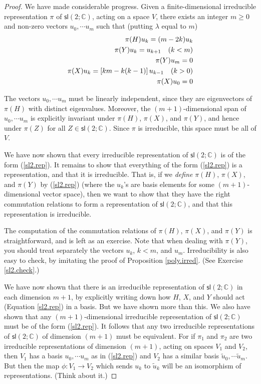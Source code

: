\documentclass[12pt]{amsbook}
\theoremstyle{plain}
\numberwithin{equation}{chapter}
\numberwithin{theorem}{chapter}
\begin{document}
\begin{proof}
We have made considerable progress. Given a finite-dimensional irreducible
representation $\pi$ of $\mathsf{sl}(2;\mathbb{C})$, acting on a space $V$,
there exists an integer $m\geq0$ and non-zero vectors $u_{0},\cdots u_{m}$
such that (putting $\lambda$ equal to $m$)
\begin{align}
\pi(H)u_{k}=(m-2k)u_{k}\nonumber\\
\pi(Y)u_{k}=u_{k+1}\quad(k<m)\nonumber\\
\pi(Y)u_{m}=0\nonumber\\
\pi(X)u_{k}=\left[  km-k(k-1)\right]  u_{k-1}\text{\quad}(k>0)\nonumber\\
\pi(X)u_{0}=0\label{sl2.rep}%
\end{align}

The vectors $u_{0},\cdots u_{m}$ must be linearly independent, since they are
eigenvectors of $\pi(H)$ with distinct eigenvalues. Moreover, the
$(m+1)$-dimensional span of $u_{0},\cdots u_{m}$ is explicitly invariant under
$\pi(H)$, $\pi(X)$, and $\pi(Y)$, and hence under $\pi(Z)$ for all
$Z\in\mathsf{sl}(2;\mathbb{C})$. Since $\pi$ is irreducible, this space must
be all of $V$.

We have now shown that every irreducible representation of $\mathsf{sl}%
(2;\mathbb{C})$ is of the form (\ref{sl2.rep}). It remains to show that
everything of the form (\ref{sl2.rep}) is a representation, and that it is
irreducible. That is, if we \textit{define} $\pi(H)$, $\pi(X)$, and $\pi(Y)$
by (\ref{sl2.rep}) (where the $u_{k}$'s are basis elements for some
$(m+1)$-dimensional vector space), then we want to show that they have the
right commutation relations to form a representation of $\mathsf{sl}%
(2;\mathbb{C})$, and that this representation is irreducible.

The computation of the commutation relations of $\pi(H)$, $\pi(X)$, and
$\pi(Y)$ is straightforward, and is left as an exercise. Note that when
dealing with $\pi(Y)$, you should treat separately the vectors $u_{k}$, $k<m$,
and $u_{m}$. Irreducibility is also easy to check, by imitating the proof of
Proposition \ref{poly.irred}. (See Exercise \ref{sl2.check}.)

We have now shown that there is an irreducible representation of
$\mathsf{sl}(2;\mathbb{C})$ in each dimension $m+1$, by explicitly writing
down how $H$, $X$, and $Y$ should act (Equation \ref{sl2.rep}) in a basis. But
we have shown more than this. We also have shown that any $(m+1)$-dimensional
irreducible representation of $\mathsf{sl}(2;\mathbb{C})$ must be of the form
(\ref{sl2.rep}). It follows that any two irreducible representations of
$\mathsf{sl}(2;\mathbb{C})$ of dimension $(m+1)$ must be equivalent. For if
$\pi_{1}$ and $\pi_{2}$ are two irreducible representations of dimension
$(m+1)$, acting on spaces $V_{1}$ and $V_{2}$, then $V_{1}$ has a basis
$u_{0},\cdots u_{m}$ as in (\ref{sl2.rep}) and $V_{2}$ has a similar basis
$\widetilde{u}_{0},\cdots\widetilde{u}_{m}$. But then the map $\phi
:V_{1}\rightarrow V_{2}$ which sends $u_{k}$ to $\widetilde{u}_{k}$ will be an
isomorphism of representations. (Think about it.)


\end{proof}
\end{document}
